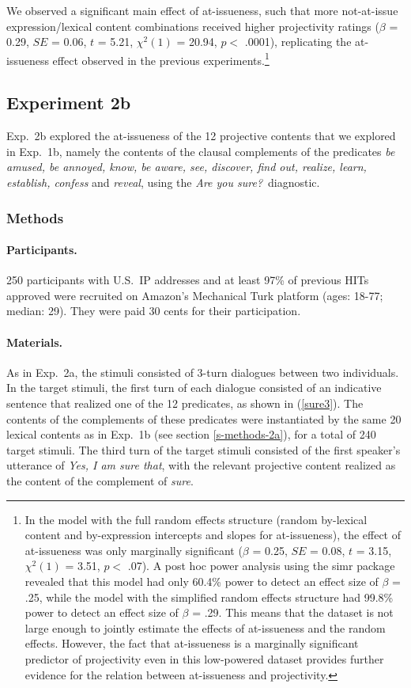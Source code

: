 \documentclass[11pt,fleqn]{article}
\newcommand{\6}{\mbox{$[\hspace*{-.6mm}[$}}
\newcommand{\9}{\mbox{$]\hspace*{-.6mm}]$}}
\begin{document}
We observed a significant main effect of at-issueness, such that more not-at-issue expression/lexical content combinations received higher projectivity ratings ($\beta$ = 0.29, $SE$ = 0.06, $t$ = 5.21, $\chi^2(1)$ = 20.94, $p <$ .0001), replicating the at-issueness effect observed in the previous experiments.\footnote{In the model with the full random effects structure (random by-lexical content and by-expression intercepts and slopes for at-issueness), the effect of at-issueness was only marginally significant ($\beta$ = 0.25, $SE$ = 0.08, $t$ = 3.15, $\chi^2(1)$ = 3.51, $p <$ .07).  A post hoc power analysis using the simr package \citep{simr} revealed that this model had only 60.4\% power to detect an effect size of $\beta$ = .25, while the model with the simplified random effects structure had 99.8\% power to detect an effect size of $\beta$ = .29. This means that the dataset is not large enough to jointly estimate the effects of at-issueness and the random effects. However, the fact that at-issueness is a marginally significant predictor of projectivity even in this low-powered dataset provides further evidence for the relation between at-issueness and projectivity.}

\subsection{Experiment 2b}\label{s-exp2b}

Exp.~2b explored the at-issueness of the 12 projective contents that we explored in Exp.~1b, namely the contents of the clausal complements of the predicates {\em be amused, be annoyed, know, be aware, see, discover, find out, realize, learn, establish, confess} and {\em reveal}, using the {\em Are you sure?}~diagnostic.

\subsubsection{Methods}

\paragraph{Participants.} 250 participants with U.S.\ IP addresses and at least 97\% of previous HITs approved were recruited on Amazon's Mechanical Turk platform (ages: 18-77; median: 29). They were paid 30 cents for their participation.

\paragraph{Materials.} As in Exp.~2a, the stimuli consisted of 3-turn dialogues between two individuals. In the target stimuli, the first turn of each dialogue consisted of an indicative sentence that realized one of the 12 predicates, as shown in (\ref{sure3}). The contents of the complements of these predicates were instantiated by the same 20 lexical contents as in Exp.~1b (see section \ref{s-methods-2a}), for a total of 240 target stimuli. The third turn of the target stimuli consisted of the first speaker's utterance of {\em Yes, I am sure that}, with the relevant projective content realized as the content of the complement of {\em sure}. 
\end{document}
